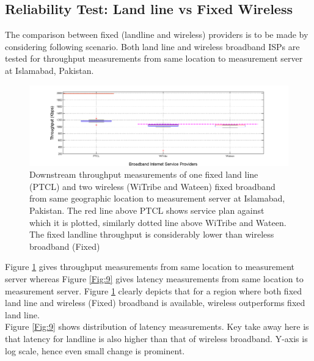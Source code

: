 \documentclass{sig-alternate-10pt}
\begin{document}
\begin{sloppypar}

\subsection {Reliability Test: Land line vs Fixed Wireless}
The comparison between fixed (landline and wireless) providers is to be made by considering following scenario. Both land line and wireless broadband ISPs are tested for throughput measurements from same location to measurement server at Islamabad, Pakistan.
\begin{figure}[t!]
\begin {center}
  \includegraphics[height=0.2 \textheight,width=0.5 \textwidth]{8.png}
   \end {center}
 \caption{Downstream throughput measurements of one fixed land line (PTCL) and two wireless (WiTribe and Wateen) fixed broadband from same geographic location to measurement server at Islamabad, Pakistan. The red line above PTCL shows service plan against which it is plotted, similarly dotted line above WiTribe and Wateen. The fixed landline throughput is considerably lower than wireless broadband (Fixed)} \label{Fig:8}
\end{figure}
Figure \ref{Fig:8} gives throughput measurements from same location to measurement server whereas Figure \ref{Fig:9} gives latency measurements from same location to measurement server. Figure \ref{Fig:8} clearly depicts that for a region where both fixed land line and wireless (Fixed) broadband is available, wireless outperforms fixed land line.\\
\indent Figure \ref{Fig:9} shows distribution of latency measurements. Key take away here is that latency for landline is also higher than that of wireless broadband. Y-axis is log scale, hence even small change is prominent.


\end{sloppypar}
\end{document}
